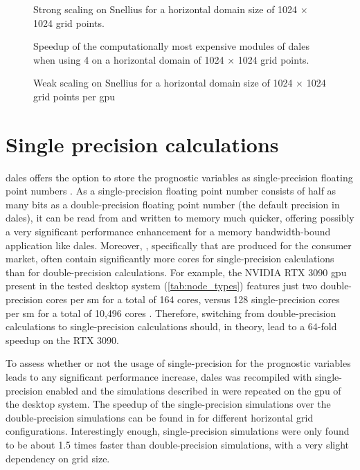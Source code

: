 \begin{figure}[h!]
    \centering
    
    \caption{Strong scaling on Snellius for a horizontal domain size of 1024 $\times$ 1024 grid points.}
    \label{fig:strong_scaling}
\end{figure}

\begin{figure}[h!]
    \centering
    
    \caption{Speedup of the computationally most expensive modules of \acrshort{dales} when using 4  on a horizontal domain of 1024 $\times$ 1024 grid points.}
    \label{fig:speedup_per_module}
\end{figure}

\begin{figure}[h!]
    \centering
    
    \caption{Weak scaling on Snellius for a horizontal domain size of 1024 $\times$ 1024 grid points per \acrshort{gpu}}
    \label{fig:weak_scaling}
\end{figure}
\section{Single precision calculations}
\acrshort{dales} offers the option to store the prognostic variables as single-precision floating point numbers \citep{janssonCloudBotanyShallow2023}. As a single-precision floating point number consists of half as many bits as a double-precision floating point number (the default precision in \acrshort{dales}), it can be read from and written to memory much quicker, offering possibly a very significant performance enhancement for a memory bandwidth-bound application like \acrshort{dales}. Moreover, , specifically  that are produced for the consumer market, often contain significantly more cores for single-precision calculations than for double-precision calculations. For example, the NVIDIA RTX 3090 \acrshort{gpu} present in the tested desktop system (\autoref{tab:node_types}) features just two double-precision cores per \acrshort{sm} for a total of 164 cores, versus 128 single-precision cores per \acrshort{sm} for a total of 10,496 cores \citep{nvidiaIntroductionNVIDIAAmpere2021}. Therefore, switching from double-precision calculations to single-precision calculations should, in theory, lead to a 64-fold speedup on the RTX 3090. 

To assess whether or not the usage of single-precision for the prognostic variables leads to any significant performance increase, \acrshort{dales} was recompiled with single-precision enabled and the simulations described in  were repeated on the \acrshort{gpu} of the desktop system. The speedup of the single-precision simulations over the double-precision simulations can be found in  for different horizontal grid configurations. Interestingly enough, single-precision simulations were only found to be about 1.5 times faster than double-precision simulations, with a very slight dependency on grid size.

